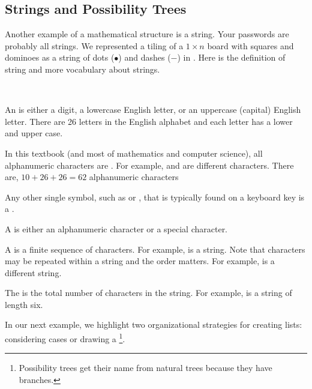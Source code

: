 
\newcommand{\substrings}{Strings and Possibility Trees}
\subsection{\substrings}
\label{sub_strings}

Another example of a mathematical structure is a string.  Your passwords are probably all strings.  We represented a tiling of a $1 \times n$ board with squares and dominoes as a string of dots ($\bullet$) and dashes ($\boldsymbol{-}$) 
in . Here is the definition of string and more vocabulary about strings.

\begin{defn}   \label{defn_characters_and_strings}
    ~
    \begin{apart}
        \item An  is either a digit, a lowercase English letter, or an uppercase (capital) English letter.  There are 26 letters in the English alphabet and each letter has a lower and upper case.
        \item In this textbook (and most of mathematics and computer science), all alphanumeric characters are . For example,  and  are different characters. There are, $10+26+26 = 62$ alphanumeric characters
        \item Any other single symbol, such as \str{\&} or \str{>}, that is typically found on a keyboard key is a .  
        \item A  is either an alphanumeric character or a special character.
        \item A  is a finite sequence of characters. For example,  is a string. Note that characters may be repeated within a string and the order matters.  For example,  is a different string. 
        \item The  is the total number of characters in the string. For example,  is a string of length six.     
    \end{apart}
\end{defn}

In our next example, we highlight two organizational strategies for creating lists: considering cases or drawing a \footnote{Possibility trees get their name from natural trees because they have branches.}.

